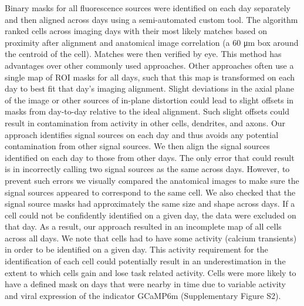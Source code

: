 Binary masks for all fluorescence sources were identified on each day separately and then aligned across days using a semi-automated custom tool. The algorithm ranked cells across imaging days with their most likely matches based on proximity after alignment and anatomical image correlation (a 60 μm box around the centroid of the cell). Matches were then verified by eye. This method has advantages over other commonly used approaches. Other approaches often use a single map of ROI masks for all days, such that this map is transformed on each day to best fit that day’s imaging alignment. Slight deviations in the axial plane of the image or other sources of in-plane distortion could lead to slight offsets in masks from day-to-day relative to the ideal alignment. Such slight offsets could result in contamination from activity in other cells, dendrites, and axons. Our approach identifies signal sources on each day and thus avoids any potential contamination from other signal sources. We then align the signal sources identified on each day to those from other days. The only error that could result is in incorrectly calling two signal sources as the same across days. However, to prevent such errors we visually compared the anatomical images to make sure the signal sources appeared to correspond to the same cell. We also checked that the signal source masks had approximately the same size and shape across days. If a cell could not be confidently identified on a given day, the data were excluded on that day. As a result, our approach resulted in an incomplete map of all cells across all days. We note that cells had to have some activity (calcium transients) in order to be identified on a given day. This activity requirement for the identification of each cell could potentially result in an underestimation in the extent to which cells gain and lose task related activity. Cells were more likely to have a defined mask on days that were nearby in time due to variable activity and viral expression of the indicator GCaMP6m (Supplementary Figure S2). 